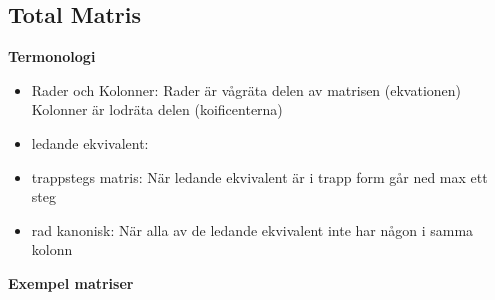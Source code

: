 \subsection{Total Matris}
\textbf{Termonologi}
\begin{itemize}
  \item Rader och Kolonner: Rader är vågräta delen av matrisen (ekvationen)
    Kolonner är lodräta delen (koificenterna)
  \item ledande ekvivalent: 
  \item trappstegs matris: När ledande ekvivalent är i trapp form går ned max ett steg
  \item rad kanonisk: När alla av de ledande ekvivalent inte har någon i samma kolonn
\end{itemize}
  
\textbf{Exempel matriser}

